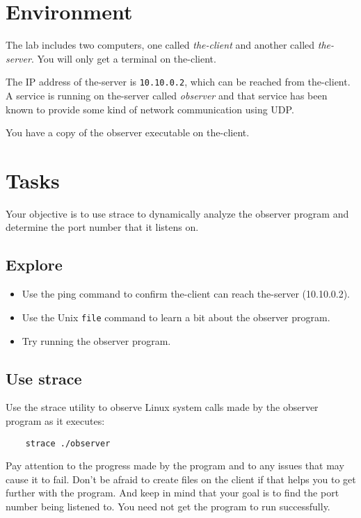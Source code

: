 \section{Environment}
The lab includes two computers, one called \textit{the-client} and another called \textit{the-server}.
You will only get a terminal on the-client.  

The IP address of the-server is {\tt 10.10.0.2}, which can be reached from the-client.
A service is running on the-server called \textit{observer} and that service has been known to provide
some kind of network communication using UDP.  

You have a copy of the observer executable on the-client.

\section{Tasks}
Your objective is to use strace to dynamically analyze the observer program and determine the
port number that it listens on.

\subsection{Explore}
\begin{itemize}
\item Use the ping command to confirm the-client can reach the-server (10.10.0.2).

\item Use the Unix {\tt file} command to learn a bit about the observer program.

\item Try running the observer program.
\end{itemize}

\subsection{Use strace}
Use the strace utility to observe Linux system calls made by the observer program as it executes:
\begin{verbatim}
    strace ./observer
\end{verbatim}
Pay attention to the progress made by the program and to any issues that may cause it to fail.
Don't be afraid to create files on the client if that helps you to get further with the program.
And keep in mind that your goal is to find the port number being listened to.  You need not get the 
program to run successfully.

